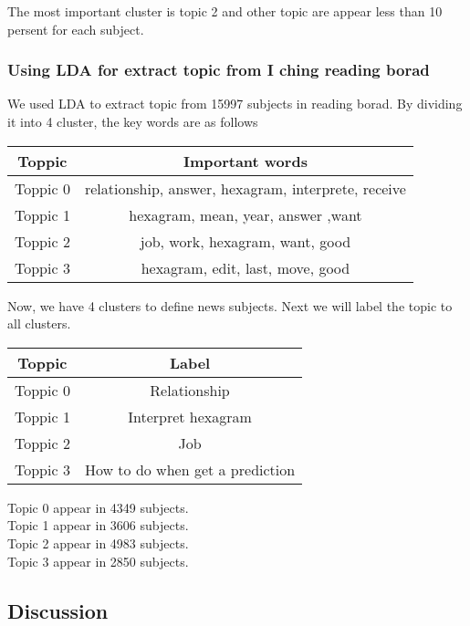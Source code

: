 \documentclass[conference]{IEEEtran}
\begin{document}
The most important cluster is topic 2 and other topic are appear less than 10 persent for each subject.\\

\subsubsection{Using LDA for extract topic from I ching reading borad}
We used LDA to extract topic from 15997 subjects in reading borad. By dividing it into 4 cluster, the key words are as follows
\begin{center}
	\begin{tabular}{ |c|c| } 
		\hline
		Toppic & Important words  \\
		\hline 
		Toppic 0 & relationship, answer, hexagram, interprete, receive\\
		\hline 
		Toppic 1 & hexagram, mean, year, answer ,want \\ 
		\hline
		Toppic 2 & job, work, hexagram, want, good\\ 
		\hline
		Toppic 3 & hexagram, edit, last, move, good\\ 
		\hline
	\end{tabular}
\end{center}

Now, we have 4 clusters to define news subjects. Next we will label the topic to all clusters.

\begin{center}
	\begin{tabular}{ |c|c| } 
		\hline
		Toppic & Label  \\
		\hline 
		Toppic 0 & Relationship\\
		\hline 
		Toppic 1 & Interpret hexagram \\ 
		\hline
		Toppic 2 & Job\\ 
		\hline
		Toppic 3 & How to do when get a prediction \\ 
		\hline
	\end{tabular}
\end{center}
Topic 0 appear in 4349 subjects.\\
Topic 1 appear in 3606 subjects.\\
Topic 2 appear in 4983 subjects.\\
Topic 3 appear in 2850 subjects.\\
\subsection{Discussion}
\end{document}
